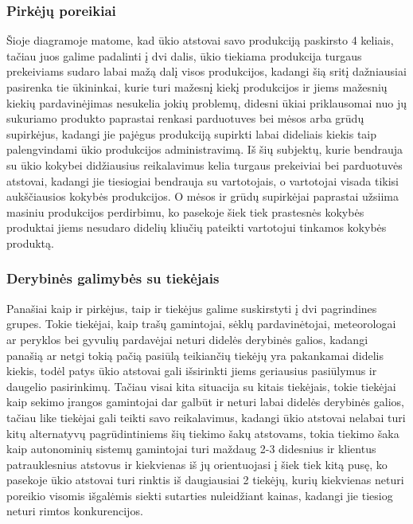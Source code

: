\documentclass[oneside]{VUMIFPSkursinis}
\begin{document}
\subsubsection{Pirkėjų poreikiai}
Šioje diagramoje matome, kad ūkio atstovai savo produkciją paskirsto 4 keliais, tačiau juos galime padalinti į dvi dalis, ūkio tiekiama produkcija turgaus prekeiviams sudaro labai mažą dalį visos produkcijos, kadangi šią sritį dažniausiai pasirenka tie ūkininkai, kurie turi mažesnį kiekį produkcijos ir jiems mažesnių kiekių pardavinėjimas nesukelia jokių problemų, didesni ūkiai priklausomai nuo jų sukuriamo produkto paprastai renkasi parduotuves bei mėsos arba grūdų supirkėjus, kadangi jie pajėgus produkciją supirkti labai dideliais kiekis taip palengvindami ūkio produkcijos administravimą. Iš šių subjektų, kurie bendrauja su ūkio kokybei didžiausius reikalavimus kelia turgaus prekeiviai bei parduotuvės atstovai, kadangi jie tiesiogiai bendrauja su vartotojais, o vartotojai visada tikisi aukščiausios kokybės produkcijos. O mėsos ir grūdų supirkėjai paprastai užsiima masiniu produkcijos perdirbimu, ko pasekoje šiek tiek prastesnės kokybės produktai jiems nesudaro didelių kliučių pateikti vartotojui tinkamos kokybės produktą.
\subsubsection{Derybinės galimybės su tiekėjais}
Panašiai kaip ir pirkėjus, taip ir tiekėjus galime suskirstyti į dvi pagrindines grupes. Tokie tiekėjai, kaip trašų gamintojai, sėklų pardavinėtojai, meteorologai ar peryklos bei gyvulių pardavėjai neturi didelės derybinės galios, kadangi panašią ar netgi tokią pačią pasiūlą teikiančių tiekėjų yra pakankamai didelis kiekis, todėl patys ūkio atstovai gali išsirinkti jiems geriausius pasiūlymus ir daugelio pasirinkimų. Tačiau visai kita situacija su kitais tiekėjais, tokie tiekėjai kaip sekimo įrangos gamintojai dar galbūt ir neturi labai didelės derybinės galios, tačiau like tiekėjai gali teikti savo reikalavimus, kadangi ūkio atstovai nelabai turi kitų alternatyvų pagrūdintiniems šių tiekimo šakų atstovams, tokia tiekimo šaka kaip autonominių sistemų gamintojai turi maždaug 2-3 didesnius ir klientus patrauklesnius atstovus ir kiekvienas iš jų orientuojasi į šiek tiek kitą pusę, ko pasekoje ūkio atstovai turi rinktis iš daugiausiai 2 tiekėjų, kurių kiekvienas neturi poreikio visomis išgalėmis siekti sutarties nuleidžiant kainas, kadangi jie tiesiog neturi rimtos konkurencijos.
	
\end{document}
